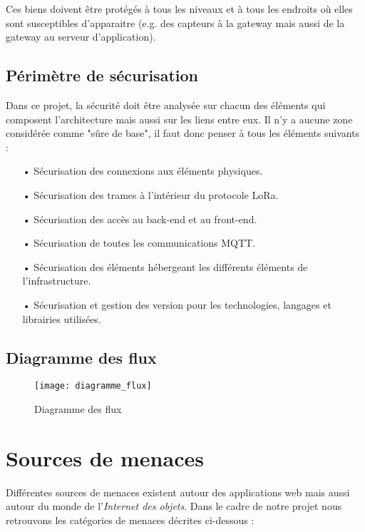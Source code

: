 Ces biens doivent être protégés à tous les niveaux et à tous les endroits où elles sont susceptibles d'apparaitre (e.g. des capteurs à la gateway mais aussi de la gateway au serveur d'application).

\subsection{Périmètre de sécurisation}

Dans ce projet, la sécurité doit être analysée sur chacun des éléments qui composent l'architecture mais aussi sur les liens entre eux. Il n'y a aucune zone considérée comme "sûre de base", il faut donc penser à tous les éléments suivants :

\begin{itemize}
\item[•] Sécurisation des connexions aux éléments physiques.
\item[•] Sécurisation des trames à l'intérieur du protocole LoRa.
\item[•] Sécurisation des accès au back-end et au front-end.
\item[•] Sécurisation de toutes les communications MQTT.
\item[•] Sécurisation des éléments hébergeant les différents éléments de l'infrastructure.
\item[•] Sécurisation et gestion des version pour les technologies, langages et librairies utilisées.
\end{itemize}
\clearpage

\subsection{Diagramme des flux}
\label{ssec:diagramme}

\begin{figure}[h!]
\centering
\texttt{[image: diagramme\_flux]}
\caption{Diagramme des flux}
\end{figure}

\clearpage
\section{Sources de menaces}

Différentes sources de menaces existent autour des applications web mais aussi autour du monde de l'\emph{Internet des objets}. Dans le cadre de notre projet nous retrouvons les catégories de menaces décrites ci-dessous :

